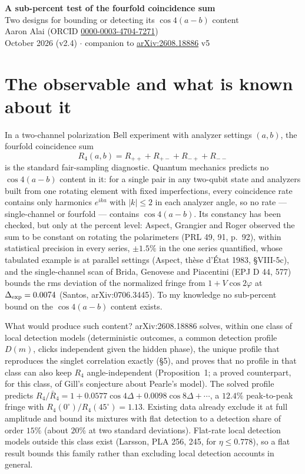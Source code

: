 \documentclass[10pt]{article}
\begin{document}
\begin{center}
{\Large\bfseries A sub-percent test of the fourfold coincidence sum}\\[3pt]
{\large Two designs for bounding or detecting its $\cos 4(a-b)$ content}\\[5pt]
Aaron Alai (ORCID \href{https://orcid.org/0000-0003-4704-7271}{0000-0003-4704-7271})\\
October 2026 (v2.4) $\cdot$ companion to \href{https://arxiv.org/abs/2608.18886}{arXiv:2608.18886} v5
\end{center}

\section*{The observable and what is known about it}
In a two-channel polarization Bell experiment with analyzer settings $(a,b)$, the fourfold coincidence sum
\[
R_4(a,b) = R_{++}+R_{+-}+R_{-+}+R_{--}
\]
is the standard fair-sampling diagnostic. Quantum mechanics predicts no $\cos 4(a-b)$ content in it: for a single pair in any two-qubit state and analyzers built from one rotating element with fixed imperfections, every coincidence rate contains only harmonics $e^{ika}$ with $|k|\le 2$ in each analyzer angle, so no rate --- single-channel or fourfold --- contains $\cos 4(a-b)$. Its constancy has been checked, but only at the percent level: Aspect, Grangier and Roger observed the sum to be constant on rotating the polarimeters (PRL 49, 91, p.~92), within statistical precision in every series, $\pm 1.5\%$ in the one series quantified, whose tabulated example is at parallel settings (Aspect, th\`ese d'\'Etat 1983, \S VIII-5c), and the single-channel scan of Brida, Genovese and Piacentini (EPJ D 44, 577) bounds the rms deviation of the normalized fringe from $1+V\cos 2\varphi$ at $\Delta_{\rm exp}=0.0074$ (Santos, arXiv:0706.3445). To my knowledge no sub-percent bound on the $\cos 4(a-b)$ content exists.

What would produce such content? arXiv:2608.18886 solves, within one class of local detection models (deterministic outcomes, a common detection profile $D(m)$, clicks independent given the hidden phase), the unique profile that reproduces the singlet correlation exactly (\S5), and proves that no profile in that class can also keep $R_4$ angle-independent (Proposition~1; a proved counterpart, for this class, of Gill's conjecture about Pearle's model). The solved profile predicts $R_4/\bar R_4 = 1 + 0.0577\cos 4\Delta + 0.0098\cos 8\Delta + \cdots$, a $12.4\%$ peak-to-peak fringe with $R_4(0^\circ)/R_4(45^\circ)=1.13$. Existing data already exclude it at full amplitude and bound its mixtures with flat detection to a detection share of order $15\%$ (about $20\%$ at two standard deviations). Flat-rate local detection models outside this class exist (Larsson, PLA 256, 245, for $\eta\le 0.778$), so a flat result bounds this family rather than excluding local detection accounts in general.
\end{document}
